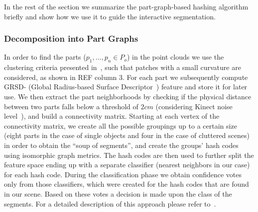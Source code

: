 In the rest of the section we summarize the part-graph-based 
hashing algorithm briefly and show how we use it to guide
the interactive segmentation.

\subsubsection{Decomposition into Part Graphs}
\label{sec:part-graphs}
In order to find the parts ($p_{1}, \dots, p_{n} \in P_{o}$) 
in the point clouds we use the clustering criteria presented in~\cite{mozos11furniture},
such that patches with a small curvature are considered, as shown in
REF
column 3.  For each part we subsequently compute GRSD- (Global Radius-based 
Surface Descriptor~\cite{irosws11vosch}) feature and store it for later use. We then 
extract the part neighborhoods by checking if the physical distance between two 
parts falls below a threshold of $2cm$ (considering Kinect noise level~\cite{kinect_accuracy}), and build a connectivity matrix. 
Starting at each vertex of the connectivity matrix, we create all the possible groupings up to a certain size 
(eight parts in the case of single objects and four in the case of cluttered scenes) 
in order to obtain the ``soup of segments'', and create the groups' hash codes
using isomorphic graph metrics. The hash codes are then used to further split the feature 
space ending up with a separate classifier (nearest neighbors in our case) for each hash code. 
During the classification phase we obtain confidence votes only from those classifiers,
which were created for the hash codes that are found in our scene. Based on these votes
a decision is made upon the class of the segments. For a detailed description of this approach 
please refer to~\cite{marton12SC}.



